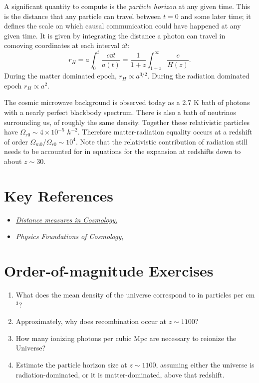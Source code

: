 A significant quantity to compute is the {\it particle horizon} at any
given time. This is the distance that any particle can travel between
$t=0$ and some later time; it defines the scale on which causal
communication could have happened at any given time. It is given by
integrating the distance a photon can travel in comoving coordinates
at each interval $\dd t$:
\begin{equation}
r_H = a \int_0^t \frac{c \dd t}{a(t)}
= \frac{1}{1+z} \int_{1+z}^\infty \frac{c}{H(z)}.
\end{equation}
During the matter dominated epoch, $r_H\propto a^{3/2}$. During the
radiation dominated epoch $r_H\propto a^2$.

The cosmic microwave background is observed today as a 2.7 K bath of
photons with a nearly perfect blackbody spectrum.  There is also a
bath of neutrinos surrounding us, of roughly the same
density. Together these relativistic particles have $\Omega_{r0} \sim
4\times 10^{-5}$ $h^{-2}$.  Therefore matter-radiation equality occurs
at a redshift of order $\Omega_{m0}/\Omega_{r0} \sim 10^4$. Note that
the relativistic contribution of radiation still needs to be accounted
for in equations for the expansion at redshifts down to about $z\sim
30$.

\section{Key References}

\begin{itemize}
  \item
    \href{http://adsabs.harvard.edu/abs/1999astro.ph..5116H}{
    {\it Distance measures in Cosmology},
      \citet{hogg99cosm}}
  \item
    {\it Physics Foundations of Cosmology},
    \citet{mukhanov05a}
\end{itemize}

\section{Order-of-magnitude Exercises}

\begin{enumerate} 
\item What does the mean density of the universe correspond to in
    particles per cm$^3$?
\item Approximately, why does recombination occur at $z\sim 1100$?
\item How many ionizing photons per cubic Mpc are necessary to
reionize the Universe?
\item Estimate the particle horizon size at $z\sim 1100$, assuming
either the universe is radiation-dominated, or it is matter-dominated,
above that redshift.
\end{enumerate} 

